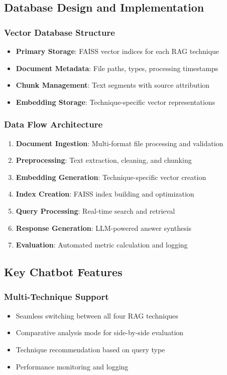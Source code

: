 \documentclass[12pt,a4paper]{article}
\begin{document}
\subsection{Database Design and Implementation}

\subsubsection{Vector Database Structure}
\begin{itemize}
    \item \textbf{Primary Storage}: FAISS vector indices for each RAG technique
    \item \textbf{Document Metadata}: File paths, types, processing timestamps
    \item \textbf{Chunk Management}: Text segments with source attribution
    \item \textbf{Embedding Storage}: Technique-specific vector representations
\end{itemize}

\subsubsection{Data Flow Architecture}
\begin{enumerate}
    \item \textbf{Document Ingestion}: Multi-format file processing and validation
    \item \textbf{Preprocessing}: Text extraction, cleaning, and chunking
    \item \textbf{Embedding Generation}: Technique-specific vector creation
    \item \textbf{Index Creation}: FAISS index building and optimization
    \item \textbf{Query Processing}: Real-time search and retrieval
    \item \textbf{Response Generation}: LLM-powered answer synthesis
    \item \textbf{Evaluation}: Automated metric calculation and logging
\end{enumerate}

\subsection{Key Chatbot Features}

\subsubsection{Multi-Technique Support}
\begin{itemize}
    \item Seamless switching between all four RAG techniques
    \item Comparative analysis mode for side-by-side evaluation
    \item Technique recommendation based on query type
    \item Performance monitoring and logging
\end{itemize}
\end{document}
